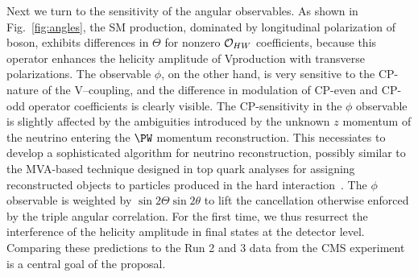 \documentclass[a4paper,11pt]{article}
\renewcommand{\PV}{{{{V}}}\xspace}
\begin{document}
Next we turn to the sensitivity of the angular observables. As shown in Fig.~\ref{fig:angles}, 
the SM production, dominated by longitudinal polarization of \PW boson, exhibits differences in $\Theta$ for nonzero ${\cal O}_{HW}$  coefficients, because this operator  enhances the helicity amplitude of \PV\PH production with transverse polarizations.%
The observable $\phi$, on the other hand, is very sensitive to the CP-nature of the \PV--\PH coupling, and the difference in modulation of CP-even and CP-odd operator coefficients is clearly visible.  
The CP-sensitivity in the $\phi$ observable is slightly affected by the ambiguities introduced by the unknown $z$ momentum of the neutrino entering the $\PW$ momentum reconstruction. 
This necessiates to develop a sophisticated algorithm for neutrino reconstruction, possibly similar to the MVA-based technique designed in top quark analyses for assigning reconstructed objects to particles produced in the hard interaction~\cite{CMS:2019esx}.
The $\phi$ observable is weighted by $\sin2\Theta\sin2\theta$ to lift the cancellation otherwise enforced by the triple angular correlation. 
For the first time, we thus resurrect the interference of the helicity amplitude in \PH final states at the detector level. 
Comparing these predictions to the Run 2 and 3 data from the CMS experiment is a central goal of the proposal.
\end{document}
